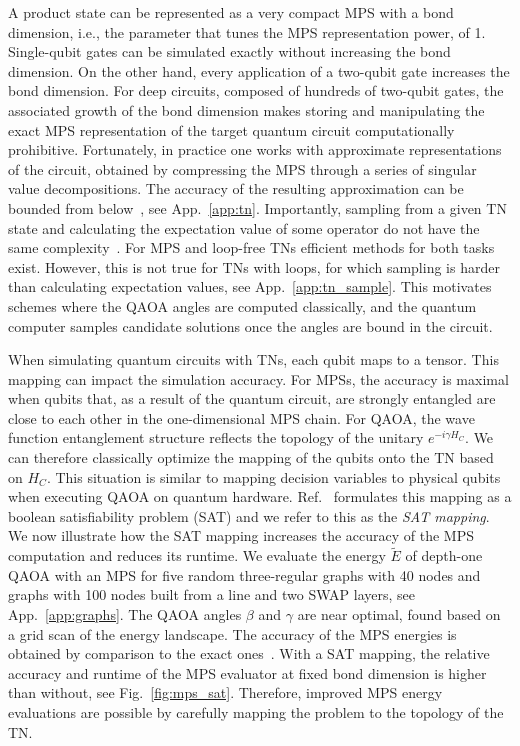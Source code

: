\documentclass[twocolumn,
english,
aps,
pra,
10pt,
longbibliography,
superscriptaddress,
amsmath,
amssymb,
floatfix
]{revtex4-2}
\begin{document}
A product state can be represented as a very compact MPS with a bond dimension, i.e., the parameter that tunes the MPS representation power, of 1.
Single-qubit gates can be simulated exactly without increasing the bond dimension.
On the other hand, every application of a two-qubit gate increases the bond dimension.
For deep circuits, composed of hundreds of two-qubit gates, the associated growth of the bond dimension makes storing and manipulating the exact MPS representation of the target quantum circuit computationally prohibitive.
Fortunately, in practice one works with approximate representations of the circuit, obtained by compressing the MPS through a series of singular value decompositions.
The accuracy of the resulting approximation can be bounded from below~\cite{Stoudenmire2020_Limits-QC,Ayral2023_DMRG-FiniteFidelity}, see App.~\ref{app:tn}.
Importantly, sampling from a given TN state and calculating the expectation value of some operator do not have the same complexity~\cite{Watanabe2026}.
For MPS and loop-free TNs efficient methods for both tasks exist.
However, this is not true for TNs with loops, for which sampling is harder than calculating expectation values, see App.~\ref{app:tn_sample}.
This motivates schemes where the QAOA angles are computed classically, and the quantum computer samples candidate solutions once the angles are bound in the circuit.

When simulating quantum circuits with TNs, each qubit maps to a tensor.
This mapping can impact the simulation accuracy.
For MPSs, the accuracy is maximal when qubits that, as a result of the quantum circuit, are strongly entangled are close to each other in the one-dimensional MPS chain.
For QAOA, the wave function entanglement structure reflects the topology of the unitary $e^{-i\gamma H_C}$.
We can therefore classically optimize the mapping of the qubits onto the TN based on $H_C$.
This situation is similar to mapping decision variables to physical qubits when executing QAOA on quantum hardware. 
Ref.~\cite{Matsuo2023} formulates this mapping as a boolean satisfiability problem (SAT) and we refer to this as the \emph{SAT mapping}.
We now illustrate how the SAT mapping increases the accuracy of the MPS computation and reduces its runtime.
We evaluate the energy $\tilde{E}$ of depth-one QAOA with an MPS for five random three-regular graphs with 40 nodes and graphs with 100 nodes built from a line and two SWAP layers, see App.~\ref{app:graphs}.
The QAOA angles $\beta$ and $\gamma$ are near optimal, found based on a grid scan of the energy landscape.
The accuracy of the MPS energies is obtained by comparison to the exact ones~\cite{Egger2021warmstartingquantum}.
With a SAT mapping, the relative accuracy and runtime of the MPS evaluator at fixed bond dimension is higher than without, see Fig.~\ref{fig:mps_sat}.
Therefore, improved MPS energy evaluations are possible by carefully mapping the problem to the topology of the TN.
\end{document}
